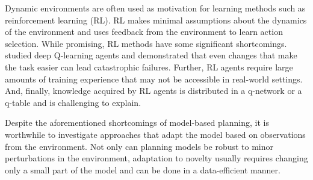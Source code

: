 \documentclass[letterpaper]{article} %
\begin{document}
Dynamic environments are often used as motivation for learning methods such as reinforcement learning (RL). RL makes minimal assumptions about the dynamics of the environment and uses feedback from the environment to learn action selection. While promising, RL methods have some significant shortcomings. \citet{witty2018measuring} studied deep Q-learning agents and demonstrated that even changes that make the task easier can lead catastrophic failures. Further, RL agents require large amounts of training experience that may not be accessible in real-world settings. And, finally, knowledge acquired by RL agents is distributed in a q-network or a q-table and is challenging to explain.



Despite the aforementioned shortcomings of model-based planning, it is worthwhile to investigate approaches that adapt the model based on observations from the environment. Not only can planning models be robust to minor perturbations in the environment, adaptation to novelty usually requires changing only a small part of the model and can be done in a data-efficient manner.
\end{document}

